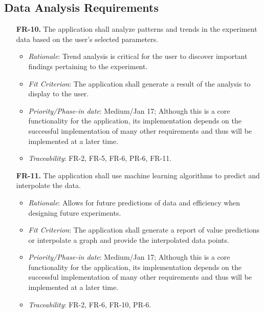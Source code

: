 \documentclass[12pt]{article}
\begin{document}
\subsection{Data Analysis Requirements}
\begin{enumerate}
    \item[\textbf{FR-10.}] The application shall analyze patterns and trends in the experiment data based on the user’s selected parameters.
    \begin{itemize}
      \item \textit{Rationale}: Trend analysis is critical for the user to discover important findings pertaining to the experiment.
      \item \textit{Fit Criterion}: The application shall generate a result of the analysis to display to the user.
      \item \textit{Priority/Phase-in date}: Medium/Jan 17; Although this is a core functionality for the application, its implementation depends on the successful implementation of many other requirements and thus will be implemented at a later time.
      \item \textit{Traceability}: FR-2, FR-5, FR-6, PR-6, FR-11.
    \end{itemize}
    \item[\textbf{FR-11.}] The application shall use machine learning algorithms to predict and interpolate the data.
    \begin{itemize}
      \item \textit{Rationale}: Allows for future predictions of data and efficiency when designing future experiments.
      \item \textit{Fit Criterion}: The application shall generate a report of value predictions or interpolate a graph and provide the interpolated data points.
      \item \textit{Priority/Phase-in date}: Medium/Jan 17; Although this is a core functionality for the application, its implementation depends on the successful implementation of many other requirements and thus will be implemented at a later time.
      \item \textit{Traceability}: FR-2, FR-6, FR-10, PR-6.
    \end{itemize}
\end{enumerate}
\end{document}

